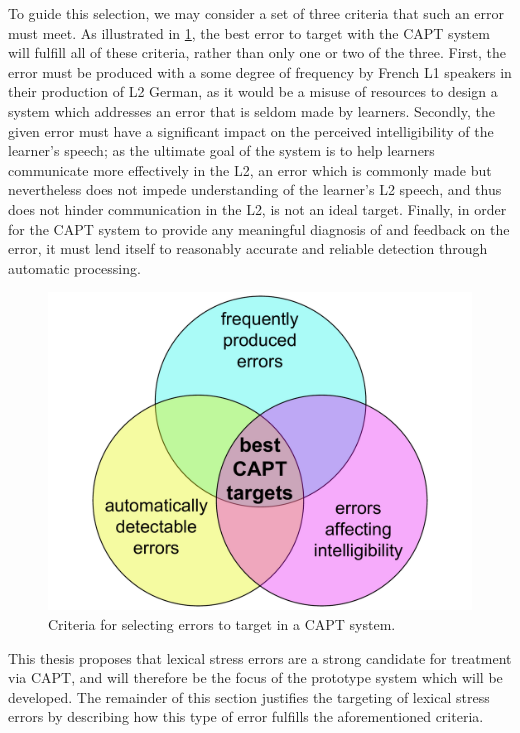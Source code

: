 	To guide this selection, we may consider %
a set of three criteria that such an error must meet. 
As illustrated in \cref{fig:errors}, the best error to target with the CAPT system will fulfill all of these criteria, rather than only one or two of the three. 
First, the error must be produced with a some degree of frequency by French L1 speakers in their production of L2 German, as it would be a misuse of resources to design a system which addresses an error that is seldom made by learners. Secondly, the given error must have a significant impact on the perceived intelligibility of the learner's speech; as the ultimate goal of the system is to help learners communicate more effectively in the L2, an error which is commonly made but nevertheless does not impede understanding of the learner's L2 speech, and thus does not hinder communication in the L2, is not an ideal target. Finally, in order for the CAPT system to provide any meaningful diagnosis of and feedback on the error, it must lend itself to reasonably accurate and reliable  detection through automatic processing. 
	
		\begin{figure}[htb]
			\centering
			\includegraphics[width=.7\textwidth]{../img/error-venn}
			\caption{Criteria for selecting errors to target in a CAPT system.}
			\label{fig:errors}
		\end{figure}
	
	This thesis proposes that lexical stress errors are a strong candidate for treatment via CAPT, and will therefore be the focus of the prototype system which will be developed. The remainder of this section justifies the targeting of lexical stress errors by describing how this type of error fulfills the aforementioned criteria.
	 
